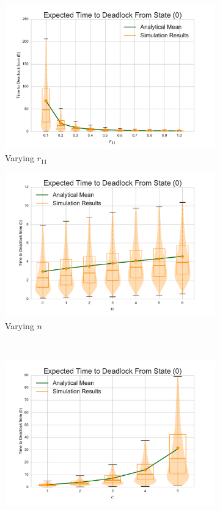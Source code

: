 \documentclass{article}
\numberwithin{equation}{section}
\begin{document}
\begin{figure}[!htbp]
\begin{center}
  \begin{subfigure}[b]{0.35\textwidth}
    \includegraphics[width=\textwidth]{images/varyr11_1Nms}
    \caption{Varying $r_{11}$}
    \label{fig:1Nms_r11}
  \end{subfigure}
  \begin{subfigure}[b]{0.35\textwidth}
    \includegraphics[width=\textwidth]{images/varyn_1Nms}
    \caption{Varying $n$}
    \label{fig:1Nms_n}
  \end{subfigure}\\
  \begin{subfigure}[b]{0.35\textwidth}
    \includegraphics[width=\textwidth]{images/varyc_1Nms}

\end{subfigure}
\end{center}
\end{figure}
\end{document}
